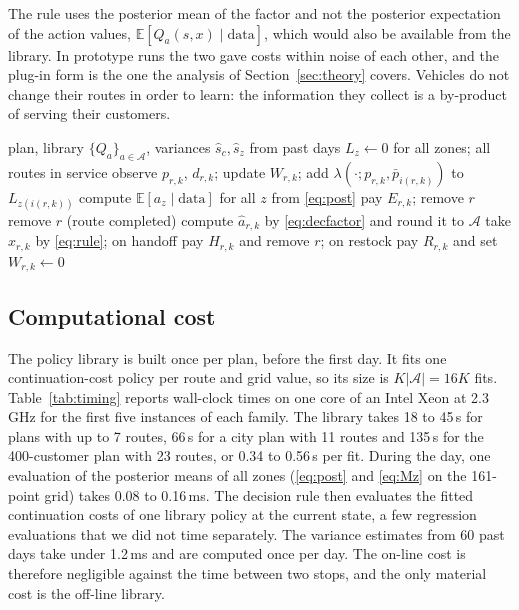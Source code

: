 \documentclass[preprint,authoryear,12pt]{elsarticle}
\newcommand{\E}{\mathbb{E}}
\begin{document}
The rule uses the posterior mean of the factor and not the posterior
expectation of the action values, $\E[Q_{a}(s,x) \mid \text{data}]$,
which would also be available from the library. In prototype runs the
two gave costs within noise of each other, and the plug-in form is the
one the analysis of Section~\ref{sec:theory} covers. Vehicles do not change their routes in
order to learn: the information they collect is a by-product of
serving their customers.

\begin{algorithm}[t]
\caption{One day of TEMPO.}\label{alg:tempo}
\begin{algorithmic}[1]
\Require plan, library $\{Q_a\}_{a \in \mathcal{A}}$, variances
$\hat s_c, \hat s_z$ from past days
\State $L_z \gets 0$ for all zones; all routes in service
    \State observe $p_{r,k}$, $d_{r,k}$; update $W_{r,k}$; add
    $\lambda(\cdot; p_{r,k}, \bar p_{i(r,k)})$ to $L_{z(i(r,k))}$
  \EndFor
  \State compute $\E[a_z \mid \text{data}]$ for all $z$ from \eqref{eq:post}
     pay $E_{r,k}$; remove $r$
     remove $r$ (route completed)
    \Else
      \State compute $\hat a_{r,k}$ by \eqref{eq:decfactor} and round it to $\mathcal{A}$
      \State take $x_{r,k}$ by \eqref{eq:rule}; on handoff pay $H_{r,k}$ and remove
      $r$; on restock pay $R_{r,k}$ and set $W_{r,k} \gets 0$
    \EndIf
  \EndFor
\EndFor
\end{algorithmic}
\end{algorithm}

\subsection{Computational cost}\label{sec:cost}

The policy library is built once per plan, before the first day. It
fits one continuation-cost policy per route and grid value, so its size
is $K|\mathcal{A}| = 16K$ fits. Table~\ref{tab:timing} reports wall-clock
times on one core of an Intel Xeon at 2.3\,GHz for the first five
instances of each family. The library takes 18 to 45\,s for plans with
up to 7 routes, 66\,s for a city plan with 11 routes and 135\,s for the
400-customer plan with 23 routes, or 0.34 to 0.56\,s per fit. During the day,
one evaluation of the posterior means of all zones
(\eqref{eq:post} and \eqref{eq:Mz} on the 161-point grid) takes 0.08 to
0.16\,ms. The decision rule then evaluates the fitted continuation
costs of one library policy at the current state, a few regression
evaluations that we did not time separately. The
variance estimates from 60 past days take under 1.2\,ms and are computed
once per day. The on-line cost is therefore negligible against the time
between two stops, and the only material cost is the off-line library.
\end{document}
